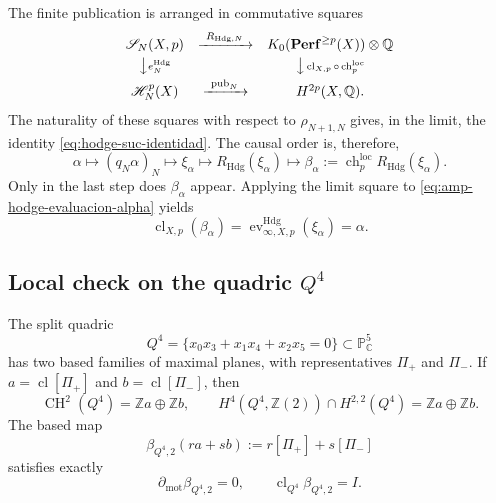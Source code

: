 The finite publication is arranged in commutative squares
\begin{equation}\label{eq:amp-hodge-cuadrado-finito}
 \begin{array}{ccc}
 \mathscr S_N(X,p)&\xrightarrow{\ R_{\mathrm{Hdg},N}\ }&
 K_0(\mathbf{Perf}^{\geq p}(X))\otimes\mathbb Q\\[1mm]
 \big\downarrow\scriptstyle e_N^{\mathrm{Hdg}}&&
 \big\downarrow\scriptstyle
   \operatorname{cl}_{X,p}\circ\operatorname{ch}^{\mathrm{loc}}_p\\[1mm]
 \mathscr H_N^p(X)&\xrightarrow{\ \operatorname{pub}_N\ }&
 H^{2p}(X,\mathbb Q).
 \end{array}
\end{equation}
The naturality of these squares with respect to \(\rho_{N+1,N}\) gives, in the
limit, the identity \eqref{eq:hodge-suc-identidad}. The causal order is,
therefore,
\begin{equation}\label{eq:amp-hodge-orden-causal}
 \alpha\longmapsto(q_N\alpha)_N
 \longmapsto\xi_\alpha
 \longmapsto R_{\mathrm{Hdg}}(\xi_\alpha)
 \longmapsto
 \beta_\alpha:=\operatorname{ch}^{\mathrm{loc}}_p
   R_{\mathrm{Hdg}}(\xi_\alpha).
\end{equation}
Only in the last step does \(\beta_\alpha\) appear. Applying the limit square
to \eqref{eq:amp-hodge-evaluacion-alpha} yields
\begin{equation}\label{eq:amp-hodge-publicacion-final}
 \operatorname{cl}_{X,p}(\beta_\alpha)=
 \operatorname{ev}^{\mathrm{Hdg}}_{\infty,X,p}(\xi_\alpha)=\alpha.
\end{equation}

\subsection{Local check on the quadric
\texorpdfstring{\(Q^4\)}{Q4}}
\label{subsec:amp-hodge-q4}

The split quadric
\begin{equation}\label{eq:amp-hodge-q4}
 Q^4=\{x_0x_3+x_1x_4+x_2x_5=0\}\subset\mathbb P^5_{\mathbb C}
\end{equation}
has two based families of maximal planes, with representatives
\(\Pi_+\) and \(\Pi_-\). If
\(a=\operatorname{cl}[\Pi_+]\) and
\(b=\operatorname{cl}[\Pi_-]\), then
\begin{equation}\label{eq:amp-hodge-q4-bases}
 \operatorname{CH}^2(Q^4)=\mathbb Za\oplus\mathbb Zb,
 \qquad
 H^4(Q^4,\mathbb Z(2))\cap H^{2,2}(Q^4)
 =\mathbb Za\oplus\mathbb Zb.
\end{equation}
The based map
\begin{equation}\label{eq:amp-hodge-q4-beta}
 \beta_{Q^4,2}(ra+sb):=r[\Pi_+]+s[\Pi_-]
\end{equation}
satisfies exactly
\begin{equation}\label{eq:amp-hodge-q4-beta-identidades}
 \partial_{\mathrm{mot}}\beta_{Q^4,2}=0,
 \qquad
 \operatorname{cl}_{Q^4}\beta_{Q^4,2}=I.
\end{equation}

